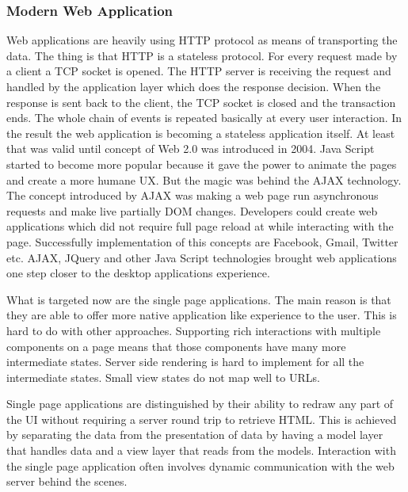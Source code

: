 \subsubsection{Modern Web Application}
Web applications are heavily using HTTP protocol as means of transporting the data. The thing is that HTTP is a stateless protocol. For every request made by a client a TCP socket is opened. The HTTP server is receiving the request and handled by the application layer which does the response decision. When the response is sent back to the client, the TCP socket is closed and the transaction ends. The whole chain of events is repeated basically at every user interaction. In the result the web application is becoming a stateless application itself. At least that was valid until concept of Web 2.0 was introduced in 2004. Java Script started to become more popular because it gave the power to animate the pages and create a more humane UX. But the magic was behind the AJAX technology. The concept introduced by AJAX was making a web page run asynchronous requests and make live partially DOM changes. Developers could create web applications which did not require full page reload at while interacting with the page. Successfully implementation of this concepts are Facebook, Gmail, Twitter etc. AJAX, JQuery and other Java Script technologies brought web applications one step closer to the desktop applications experience.

What is targeted now are the single page applications. The main reason is that they are able to offer more native application like experience to the user. This is hard to do with other approaches. Supporting rich interactions with multiple components on a page means that those components have many more intermediate states. Server side rendering is hard to implement for all the intermediate states. Small view states do not map well to URLs.

Single page applications are distinguished by their ability to redraw any part of the UI without requiring a server round trip to retrieve HTML. This is achieved by separating the data from the presentation of data by having a model layer that handles data and a view layer that reads from the models. Interaction with the single page application often involves dynamic communication with the web server behind the scenes.

